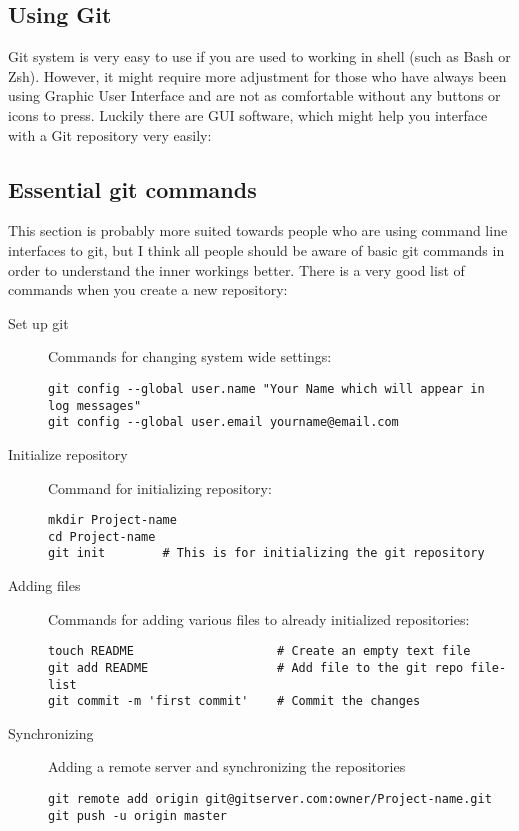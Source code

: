 \documentclass[
    draft
]{scrartcl}
\begin{document}
%
\subsection{Using Git}

Git system is very easy to use if you are used to working in shell (such as Bash
    or Zsh).
%
However, it might require more adjustment for those who have always been using
    Graphic User Interface and are not as comfortable without any buttons or
    icons to press.
%
Luckily there are GUI software, which might help you interface with a Git
    repository very easily:
%

%
\subsection{Essential git commands}

%
This section is probably more suited towards people who are using command line
    interfaces to git, but I think all people should be aware of basic git
    commands in order to understand the inner workings better.
%
There is a very good list of commands when you create a new 
 repository:
%
%
\begin{description}
    \item[Set up git] Commands for changing system wide settings:
\begin{lstlisting}
git config --global user.name "Your Name which will appear in log messages"
git config --global user.email yourname@email.com
\end{lstlisting}

    \item[Initialize repository] Command for initializing repository:
\begin{lstlisting}
mkdir Project-name
cd Project-name
git init        # This is for initializing the git repository
\end{lstlisting}

    \item[Adding files] Commands for adding various files to already initialized
        repositories:
\begin{lstlisting}
touch README                    # Create an empty text file
git add README                  # Add file to the git repo file-list
git commit -m 'first commit'    # Commit the changes
\end{lstlisting}

    \item[Synchronizing] Adding a remote server and synchronizing the
        repositories
\begin{lstlisting}
git remote add origin git@gitserver.com:owner/Project-name.git
git push -u origin master
\end{lstlisting}

\end{description}
\end{document}
